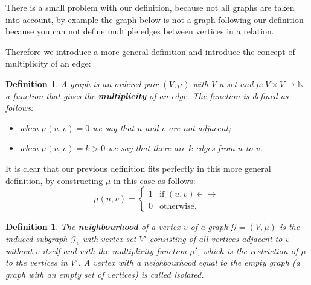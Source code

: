 \documentclass[a4paper,11pt]{report}
\newtheorem{definition}[theorem]{Definition}
\newcommand{\N}{{\mathbb N}}
\newcommand{\graf}{\mathscr{G}}
\begin{document}
There is a small problem with our definition, because not all graphs are taken 
into account, by example the  graph below is not a graph following our definition 
because you can not define multiple edges between vertices in a relation. 

  \begin{center}
\end{center}




Therefore we introduce a more general definition and introduce the concept of 
multiplicity of an edge:

\begin{definition}
  A graph is an ordered pair $(V, \mu)$ with $V$ a set and $\mu: V \times V \to \N$ a function that gives the \textbf{multiplicity} of an edge.
  The function is defined as follows:
  \begin{itemize}
    \item when $\mu(u, v) = 0$ we say that $u$ and $v$ are not adjacent;
    \item when $\mu(u, v) = k > 0$ we say that there are $k$ edges from $u$ to 
    $v$.
  \end{itemize} 
\end{definition}
It is clear that our previous definition fits perfectly in this more general definition, by constructing $\mu$ in this case as follows:
$$\mu(u,v)= \begin{cases} 1 &\mbox{if } (u,v) \in \to \\ 
0 & \mbox{otherwise}. \end{cases}$$ 
 \begin{definition}
  The \textbf{neighbourhood} of a vertex $v$ of a graph $\graf=(V,\mu)$ is the induced subgraph $\graf_v$ 
 with vertex set $V'$ consisting of all vertices adjacent to $v$ without $v$ itself and with the multiplicity function $\mu'$,
 which is the restriction of $\mu$ to the vertices in $V'$.
 A vertex with a neighbourhood equal to the empty graph (a graph with an empty set of vertices) is called 
 \emph{isolated}.
\end{definition}  
  
\end{document}
